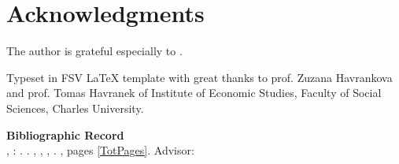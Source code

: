 \section*{Acknowledgments}
The author is grateful especially to \Supervisor.





\vfill

\noindent Typeset in FSV \LaTeX \hspace{0cm} template with great thanks to prof. Zuzana Havrankova and prof. Tomas Havranek of Institute of Economic Studies, Faculty of Social Sciences, Charles University. 

\bigskip

\noindent \textbf{Bibliographic Record} \\
\LastNameDP, \FirstNameDP: \emph{\Bookname}. \BookName. \CUNI, \FSS, \IES, \Place. \Year, pages \ref*{TotPages}. Advisor: \Supervisor


